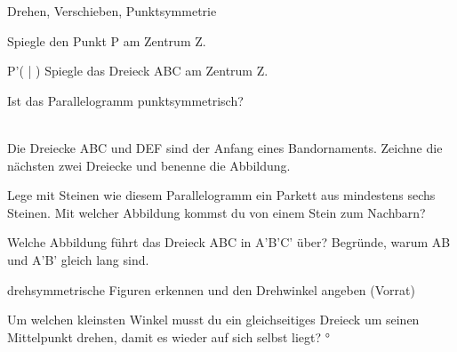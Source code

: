 \begin{aufgabe}{Drehen, Verschieben, Punktsymmetrie}
\begin{teile}
\begin{ksys}[xmin=-6,xmax=7,ymin=-2,ymax=7]     \end{ksys}
\teil Spiegle den Punkt P am Zentrum Z.

\begin{ksys}[xmin=-5,xmax=8,ymin=-5,ymax=6]   \end{ksys}
P'( \leerfeld | \leerfeld )
\teil Spiegle das Dreieck ABC am Zentrum Z.

\begin{ksys}[xmin=-6,xmax=8,ymin=-5,ymax=8]     \end{ksys}
\teil Ist das Parallelogramm punktsymmetrisch? \\  \\ 

\teil Die Dreiecke ABC und DEF sind der Anfang eines Bandornaments. Zeichne die nächsten zwei Dreiecke und benenne die Abbildung.

\begin{ksys}[xmin=0,xmax=12,ymin=0,ymax=4]       \end{ksys}
\teil Lege mit Steinen wie diesem Parallelogramm ein Parkett aus mindestens sechs Steinen. Mit welcher Abbildung kommst du von einem Stein zum Nachbarn?

\teil Welche Abbildung führt das Dreieck ABC in A'B'C' über? Begründe, warum AB und A'B' gleich lang sind.

\begin{ksys}[xmin=-5,xmax=5,ymin=-4,ymax=4]        \end{ksys}
\end{teile}
\end{aufgabe}

\begin{aufgabe}{drehsymmetrische Figuren erkennen und den Drehwinkel angeben (Vorrat)}
\begin{teile}
\teil Um welchen kleinsten Winkel musst du ein gleichseitiges Dreieck um seinen Mittelpunkt drehen, damit es wieder auf sich selbst liegt? \leerfeld °
\end{teile}
\end{aufgabe}

